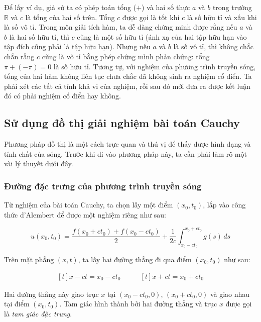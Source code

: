 \documentclass[a4paper]{article}
\begin{document}
Để lấy ví dụ, giả sử ta có phép toán tổng ($+$) và hai số thực $a$ và $b$ trong trường $\mathbb{R}$ và $c$ là tổng của hai số trên. Tổng $c$ được gọi là tốt khi $c$ là số hữu tỉ và xấu khi là số vô tỉ. Trong môn giải tích hàm, ta dễ dàng chứng minh được rằng nếu $a$ và $b$ là hai số hữu tỉ, thì $c$ cũng là một số hữu tỉ (ánh xạ của hai tập hữu hạn vào tập đích cũng phải là tập hữu hạn). Nhưng nếu $a$ và $b$ là số vô tỉ, thì không chắc chắn rằng $c$ cũng là vô tỉ bằng phép chứng mình phản chứng: tổng $\pi + (-\pi) = 0$ là số hữu tỉ. Tương tự, với nghiệm của phương trình truyền sóng, tổng của hai hàm không liên tục chưa chắc đã không sinh ra nghiệm cổ điển. Ta phải xét các tất cả tính khả vi của nghiệm, rồi sau đó mới đưa ra được kết luận đó có phải nghiệm cổ điển hay không.

\subsection{Sử dụng đồ thị giải nghiệm bài toán Cauchy}

Phương pháp đồ thị là một cách trực quan và thú vị để thấy được hình dạng và tính chất của sóng. Trước khi đi vào phương pháp này, ta cần phải làm rõ một vài lý thuyết dưới đây.

\subsubsection{Đường đặc trưng của phương trình truyền sóng}

Từ nghiệm của bài toán Cauchy, ta chọn lấy một điểm $(x_0, t_0)$, lắp vào công thức d'Alembert để được một nghiệm riêng như sau:

\begin{equation*}
u(x_0, t_0) = \frac{f(x_0 + ct_0) + f(x_0 - ct_0)}{2} + \frac{1}{2c} \int_{x_0 - ct_0}^{x_0+ct_0} g(s) \,ds
\end{equation*}

Trên mặt phẳng $(x, t)$, ta lấy hai đường thẳng đi qua điểm $(x_0, t_0)$ như sau:

\begin{equation*}
\begin{aligned}[t]
x - ct = x_0 - ct_0
\end{aligned}
\qquad
\begin{aligned}[t]
x + ct = x_0 + ct_0
\end{aligned}
\end{equation*}

Hai đường thẳng này giao trục $x$ tại $(x_0 - ct_0, 0)$, $(x_0 + ct_0, 0)$ và giao nhau tại điểm $(x_0, t_0)$. Tam giác hình thành bởi hai đường thẳng và trục $x$ được gọi là \emph{tam giác đặc trưng}.
\end{document}
